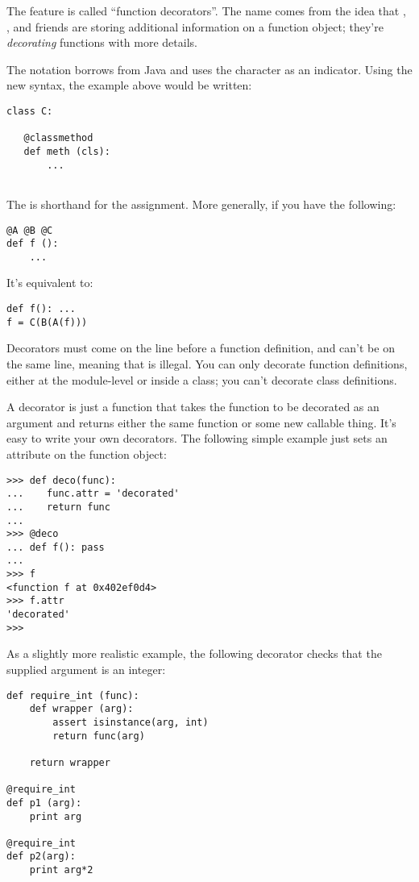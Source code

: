 \documentclass{howto}
\begin{document}
The feature is called ``function decorators''.  The name comes from
the idea that , , and
friends are storing additional information on a function object; they're
\emph{decorating} functions with more details.  

The notation borrows from Java and uses the  character as an
indicator.  Using the new syntax, the example above would be written:

\begin{verbatim}
class C:

   @classmethod
   def meth (cls):
       ...
   
\end{verbatim}

The  is shorthand for the
 assignment.  More generally, if you have
the following:

\begin{verbatim}
@A @B @C
def f ():
    ...
\end{verbatim}

It's equivalent to:

\begin{verbatim}
def f(): ...
f = C(B(A(f)))
\end{verbatim}

Decorators must come on the line before a function definition, and
can't be on the same line, meaning that  is
illegal.  You can only decorate function definitions, either at the
module-level or inside a class; you can't decorate class definitions.

A decorator is just a function that takes the function to be decorated
as an argument and returns either the same function or some new
callable thing.  It's easy to write your own decorators.  The
following simple example just sets an attribute on the function
object:

\begin{verbatim}
>>> def deco(func):
...    func.attr = 'decorated'
...    return func
...
>>> @deco
... def f(): pass
...
>>> f
<function f at 0x402ef0d4>
>>> f.attr
'decorated'
>>>
\end{verbatim}

As a slightly more realistic example, the following decorator checks
that the supplied argument is an integer:

\begin{verbatim}
def require_int (func):
    def wrapper (arg):
        assert isinstance(arg, int)
        return func(arg)

    return wrapper

@require_int
def p1 (arg):
    print arg

@require_int
def p2(arg):
    print arg*2
\end{verbatim}
\end{document}
